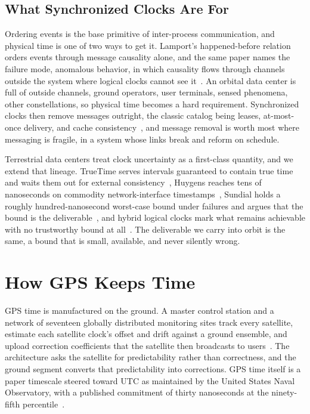 \documentclass[twocolumn,10pt]{article}
\begin{document}
\subsection{What Synchronized Clocks Are For}\label{sec:clocksfor}
Ordering events is the base primitive of inter-process communication, and physical time is one of two ways to get it. Lamport's happened-before relation orders events through message causality alone, and the same paper names the failure mode, anomalous behavior, in which causality flows through channels outside the system where logical clocks cannot see it~\cite{lamport1978}. An orbital data center is full of outside channels, ground operators, user terminals, sensed phenomena, other constellations, so physical time becomes a hard requirement. Synchronized clocks then remove messages outright, the classic catalog being leases, at-most-once delivery, and cache consistency~\cite{liskov1991}, and message removal is worth most where messaging is fragile, in a system whose links break and reform on schedule.

Terrestrial data centers treat clock uncertainty as a first-class quantity, and we extend that lineage. TrueTime serves intervals guaranteed to contain true time and waits them out for external consistency~\cite{corbett2012}, Huygens reaches tens of nanoseconds on commodity network-interface timestamps~\cite{geng2018}, Sundial holds a roughly hundred-nanosecond worst-case bound under failures and argues that the bound is the deliverable~\cite{li2020}, and hybrid logical clocks mark what remains achievable with no trustworthy bound at all~\cite{kulkarni2014}. The deliverable we carry into orbit is the same, a bound that is small, available, and never silently wrong.

\section{How GPS Keeps Time}\label{sec:gps}
GPS time is manufactured on the ground. A master control station and a network of seventeen globally distributed monitoring sites track every satellite, estimate each satellite clock's offset and drift against a ground ensemble, and upload correction coefficients that the satellite then broadcasts to users~\cite{gpscontrol}. The architecture asks the satellite for predictability rather than correctness, and the ground segment converts that predictability into corrections. GPS time itself is a paper timescale steered toward UTC as maintained by the United States Naval Observatory, with a published commitment of thirty nanoseconds at the ninety-fifth percentile~\cite{gpssps}.
\end{document}
